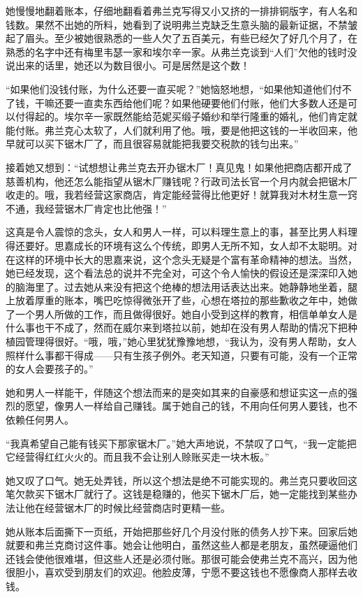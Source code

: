 \par 她慢慢地翻着账本，仔细地翻看着弗兰克写得又小又挤的一排排铜版字，有人名和钱数。果然不出她的所料，她看到了说明弗兰克缺乏生意头脑的最新证据，不禁皱起了眉头。至少被她很熟悉的一些人欠了五百美元，有些已经欠了好几个月了，在熟悉的名字中还有梅里韦瑟一家和埃尔辛一家。从弗兰克谈到“人们”欠他的钱时没说出来的话里，她还以为数目很小。可是居然是这个数！
\par “如果他们没钱付账，为什么还要一直买呢？”她恼怒地想，“如果他知道他们付不了钱，干嘛还要一直卖东西给他们呢？如果他硬要他们付账，他们大多数人还是可以付得起的。埃尔辛一家既然能给范妮买缎子婚纱和举行隆重的婚礼，他们肯定就能付账。弗兰克心太软了，人们就利用了他。哦，要是他把这钱的一半收回来，他早就可以买下锯木厂了，而且很容易就能把我要交税款的钱匀出来。”
\par 接着她又想到：“试想想让弗兰克去开办锯木厂！真见鬼！如果他把商店都开成了慈善机构，他还怎么能指望从锯木厂赚钱呢？行政司法长官一个月内就会把锯木厂收走的。哦，我若经营这家商店，肯定能经营得比他更好！就算我对木材生意一窍不通，我经营锯木厂肯定也比他强！”
\par 这真是令人震惊的念头，女人和男人一样，可以料理生意上的事，甚至比男人料理得还要好。思嘉成长的环境有这么个传统，即男人无所不知，女人却不太聪明。对在这样的环境中长大的思嘉来说，这个念头无疑是个富有革命精神的想法。当然，她已经发现，这个看法总的说并不完全对，可这个令人愉快的假设还是深深印入她的脑海里了。过去她从来没有把这个绝棒的想法用话表达出来。她静静地坐着，腿上放着厚重的账本，嘴巴吃惊得微张开了些，心想在塔拉的那些歉收之年中，她做了一个男人所做的工作，而且做得很好。她自小受到这样的教育，相信单单女人是什么事也干不成了，然而在威尔来到塔拉以前，她却在没有男人帮助的情况下把种植园管理得很好。“哦，哦，”她心里犹犹豫豫地想，“我认为，没有男人帮助，女人照样什么事都干得成——只有生孩子例外。老天知道，只要有可能，没有一个正常的女人会要孩子的。”
\par 她和男人一样能干，伴随这个想法而来的是突如其来的自豪感和想证实这一点的强烈的愿望，像男人一样给自己赚钱。属于她自己的钱，不用向任何男人要钱，也不依赖任何男人。
\par “我真希望自己能有钱买下那家锯木厂。”她大声地说，不禁叹了口气，“我一定能把它经营得红红火火的。而且我不会让别人赊账买走一块木板。”
\par 她又叹了口气。她无处弄钱，所以这个想法是绝不可能实现的。弗兰克只要收回这笔欠款买下锯木厂就行了。这钱是稳赚的，他买下锯木厂后，她一定能找到某些办法让他在经营锯木厂的时候比经营商店时更精一些。
\par 她从账本后面撕下一页纸，开始把那些好几个月没付账的债务人抄下来。回家后她就要和弗兰克商讨这件事。她会让他明白，虽然这些人都是老朋友，虽然硬逼他们还钱会使他很难堪，但这些人还是必须付账。那很可能会使弗兰克不高兴，因为他很胆小，喜欢受到朋友们的欢迎。他脸皮薄，宁愿不要这钱也不愿像商人那样去收钱。

